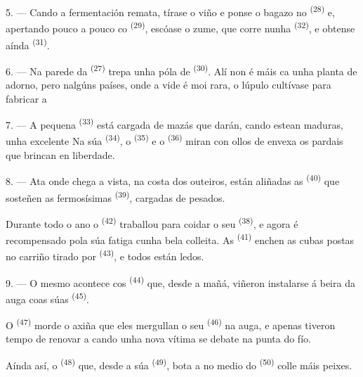 5. --- Cando a fermentación remata, tírase o viño e ponse o bagazo no 
\textsuperscript{(28)} e, apertando pouco a pouco co  \textsuperscript{(29)},
escóase o zume, que corre nunha  \textsuperscript{(32)}, e obtense aínda
 \textsuperscript{(31)}.

\VUsaut{6.0mm}
\VUsaut{3.4mm}

6. --- Na parede da  \textsuperscript{(27)} trepa unha póla de
 \textsuperscript{(30)}. Alí non é máis ca unha planta de adorno, pero
nalgúns países, onde a vide é moi rara, o lúpulo cultívase para fabricar a

7. --- A pequena  \textsuperscript{(33)} está cargada de mazás que darán,
cando estean maduras, unha excelente  Na súa 
\textsuperscript{(34)}, o  \textsuperscript{(35)} e o
 \textsuperscript{(36)} miran con ollos de envexa os pardais que
brincan en liberdade.

8. --- Ata onde chega a vista, na costa dos outeiros, están aliñadas as
 \textsuperscript{(40)} que sosteñen as fermosísimas
 \textsuperscript{(39)}, cargadas de  pesados.

Durante todo o ano o  \textsuperscript{(42)} traballou para coidar o seu
 \textsuperscript{(38)}, e agora é recompensado pola súa fatiga cunha bela
colleita. As  \textsuperscript{(41)} enchen as cubas postas no carriño
tirado por  \textsuperscript{(43)}, e todos están ledos.

\VUsaut{5.0mm}
\VUsaut{3.4mm}

9. --- O mesmo acontece cos  \textsuperscript{(44)} que, desde a
mañá, viñeron instalarse á beira da auga coas súas 
\textsuperscript{(45)}.

O  \textsuperscript{(47)} morde o  axiña que eles mergullan o seu
 \textsuperscript{(46)} na auga, e apenas tiveron tempo de renovar a
 cando unha nova vítima se debate na punta do fío.

Aínda así, o  \textsuperscript{(48)} que, desde a súa
 \textsuperscript{(49)}, bota a  no medio do 
\textsuperscript{(50)} colle máis peixes.

